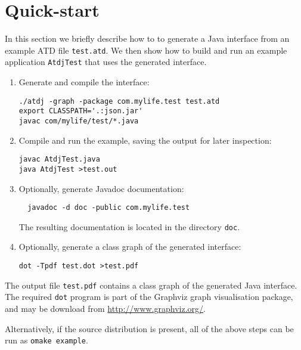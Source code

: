 
\section{Quick-start}

In this section we briefly describe how to to generate a Java interface from an
example ATD file \texttt{test.atd}.  We then show how to
build and run an
example application \texttt{AtdjTest} that uses the
generated interface.

\begin{enumerate}
\item Generate and compile the interface:

\begin{verbatim}
./atdj -graph -package com.mylife.test test.atd
export CLASSPATH='.:json.jar'
javac com/mylife/test/*.java
\end{verbatim}

\item Compile and run the example, saving the output for later inspection:

\begin{verbatim}
javac AtdjTest.java
java AtdjTest >test.out
\end{verbatim}

\item Optionally, generate Javadoc documentation:

\begin{verbatim}
  javadoc -d doc -public com.mylife.test
\end{verbatim}

The resulting documentation is located in the directory
\texttt{doc}.

\item Optionally, generate a class graph of the generated interface:

\begin{verbatim}
dot -Tpdf test.dot >test.pdf
\end{verbatim}
\end{enumerate}

The output file \texttt{test.pdf} contains a class graph of the
generated Java interface.  The required \texttt{dot} program is part of the
Graphviz graph visualisation package, and may be download from
\url{http://www.graphviz.org/}.

Alternatively, if the source distribution is present, all of the
above steps can be run as \texttt{omake example}.

